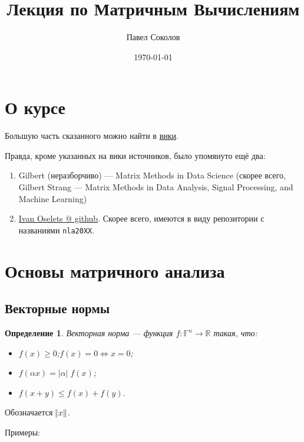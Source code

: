 \documentclass[a4paper, 12pt]{article}
\title{Лекция по Матричным Вычислениям}
\author{Павел Соколов}
\date{\today}
\renewcommand{\le}{\ensuremath{\leqslant}}
\renewcommand{\ge}{\ensuremath{\geqslant}}
\newcommand{\R}{\mathbb{R}}
\newtheorem{definition}{Определение}[section]
\begin{document}
\maketitle

\section{О курсе}

Большую часть сказанного можно найти в
\href{http://wiki.cs.hse.ru/Матричные_Вычисления_20/21}{вики}.

Правда, кроме указанных на вики источников, было упомянуто ещё два:

\begin{enumerate}
    \item Gilbert (неразборчиво) --- Matrix Methods in Data Science (скорее
        всего, Gilbert Strang --- Matrix Methods in Data Analysis, Signal
        Processing, and Machine Learning)
    \item \href{https://github.com/oseledets}{Ivan Oselets @ github}. Скорее
        всего, имеются в виду репозитории с названиями \verb|nla20XX|.
\end{enumerate}

\section{Основы матричного анализа}

\subsection{Векторные нормы}

\begin{definition}
    Векторная норма --- функция $f: \mathbb{F}^n \to \R$ такая, что:
    \begin{itemize}
        \item $f(x) \ge 0$;\quad $f(x) = 0 \Leftrightarrow x = 0$;
        \item $f(\alpha x) = |\alpha|\; f(x)$;
        \item $f(x + y) \le f(x) + f(y)$.
    \end{itemize}
\end{definition}

Обозначается $\norm{x}$.

Примеры:
\end{document}
